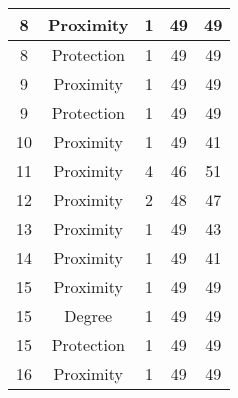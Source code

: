 \documentclass[results.tex]{subfiles}
\begin{document}
\begin{center}
\begin{tabular}{| c || c | c | c | c |}
            \hline
            8                       & Proximity                    & 1                      & 49                      & 49                   \\
            \hline
            8                       & Protection                   & 1                      & 49                      & 49                   \\
            \hline
            9                       & Proximity                    & 1                      & 49                      & 49                   \\
            \hline
            9                       & Protection                   & 1                      & 49                      & 49                   \\
            \hline
            10                      & Proximity                    & 1                      & 49                      & 41                   \\
            \hline
            11                      & Proximity                    & 4                      & 46                      & 51                   \\
            \hline
            12                      & Proximity                    & 2                      & 48                      & 47                   \\
            \hline
            13                      & Proximity                    & 1                      & 49                      & 43                   \\
            \hline
            14                      & Proximity                    & 1                      & 49                      & 41                   \\
            \hline
            15                      & Proximity                    & 1                      & 49                      & 49                   \\
            \hline
            15                      & Degree                       & 1                      & 49                      & 49                   \\
            \hline
            15                      & Protection                   & 1                      & 49                      & 49                   \\
            \hline
            16                      & Proximity                    & 1                      & 49                      & 49                   \\

\end{tabular}
\end{center}
\end{document}
